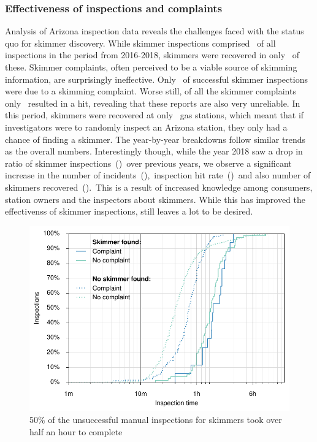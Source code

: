 
\subsubsection{Effectiveness of inspections and complaints} %

Analysis of Arizona inspection data reveals the challenges faced with the
status quo for skimmer discovery. While skimmer inspections comprised
\azALLskinsppct~of all inspections in the period from 2016-2018, skimmers were
recovered in only \azALLinsphr~of these. Skimmer complaints, often perceived to
be a viable source of skimming information, are surprisingly ineffective. Only
\azALLskinc~of successful skimmer inspections were due to a skimming complaint.
Worse still, of all the skimmer complaints only \azALLskinsphr~resulted in a
hit, revealing that these reports are also very unreliable. In this period,
skimmers were recovered at only \azALLsksta~gas stations, which meant that if
investigators were to randomly inspect an Arizona station, they only had a
\azALLstarisk chance of finding a skimmer. The year-by-year
breakdowns follow similar trends as the overall numbers. Interestingly though,
while the year 2018 saw a drop in ratio of skimmer
inspections~(\azXVIIIskinsppct)~over previous years, we observe a significant
increase in the number of incidents~(\azXVIIIincidents),~inspection hit
rate~(\azXVIIIinsphr)~and also number of skimmers
recovered~(\azXVIIIskimmers).~This is a result of increased knowledge among
consumers, station owners and the inspectors about skimmers. While this has
improved the effectivenss of skimmer inspections, still leaves a lot to be
desired.

\begin{figure}
    \centering
    \includegraphics[width=\linewidth]{plots/arizona_analysis_all.pdf}
    \caption{
    \label{fig:cdf_arizona_timetaken}
    50\% of the unsuccessful manual inspections for skimmers took over half an hour to complete
    }
\end{figure}

